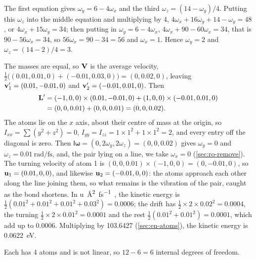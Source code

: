 The first equation gives $\omega_y = 6 -
4\omega_x$ and the third $\omega_z = (14 - \omega_y)/4$. Putting this
$\omega_z$ into the middle equation and multiplying by 4, $4\omega_x +
16\omega_y + 14 - \omega_y = 48$, or $4\omega_x + 15\omega_y = 34$; then
putting in $\omega_y = 6 - 4\omega_x$, $4\omega_x + 90 - 60\omega_x = 34$,
that is $90 - 56\omega_x = 34$, so $56\omega_x = 90 - 34 = 56$ and
$\omega_x = 1$. Hence $\omega_y = 2$ and
$\omega_z = (14 - 2)/4 = 3$.

The masses are equal, so $\bm{\mathrm{V}}$ is the average
velocity, $\frac12\bigl((0.01, 0.01, 0) + (-0.01, 0.03, 0)\bigr) = (0,
0.02, 0)$, leaving $\bm{\mathrm{v}}_1' = (0.01, -0.01, 0)$ and
$\bm{\mathrm{v}}_2' = (-0.01, 0.01, 0)$. Then
\begin{align*}
   \bm{\mathrm{L}}' &= (-1, 0, 0)\times(0.01, -0.01, 0)
      + (1, 0, 0)\times(-0.01, 0.01, 0)\\
   &= (0, 0, 0.01) + (0, 0, 0.01) = (0, 0, 0.02) .
\end{align*}
The atoms lie on the $x$ axis, about their centre of mass at the origin, so
$I_{xx} = \sum(y^2 + z^2) = 0$, $I_{yy} = I_{zz} = 1\times1^2 + 1\times1^2
= 2$, and every entry off the diagonal is zero. Then $\mathsf{I}
\boldsymbol{\omega} = (0, 2\omega_y, 2\omega_z) = (0, 0, 0.02)$ gives
$\omega_y = 0$ and $\omega_z = \SI{0.01}{\radian\per\femto\second}$, and,
the pair lying on a line, we take $\omega_x = 0$ (\cref{sec:ro-remove}).
The turning velocity of atom 1 is $(0, 0, 0.01)\times(-1, 0, 0) = (0,
-0.01, 0)$, so $\bm{\mathrm{u}}_1 = (0.01, 0, 0)$, and likewise $\bm{\mathrm{u}}_2 = (-0.01,
0, 0)$: the atoms approach each other along the line joining them, so what
remains is the vibration of the pair, caught as the bond shortens. In \si{\amu\angstrom\squared\per\femto\second
\squared}, the kinetic energy is $\frac12(0.01^2 + 0.01^2 + 0.01^2 +
0.03^2) = 0.0006$; the drift has $\frac12\times2\times0.02^2 = 0.0004$, the
turning $\frac12\times2\times0.01^2 = 0.0001$ and the rest $\frac12(0.01^2
+ 0.01^2) = 0.0001$, which add up to 0.0006. Multiplying by
\num{103.6427} (\cref{sec:en-atoms}), the kinetic energy is
\SI{0.0622}{\electronvolt}.

Each has 4 atoms and is not linear, so $12 - 6 =
6$ internal degrees of freedom.


